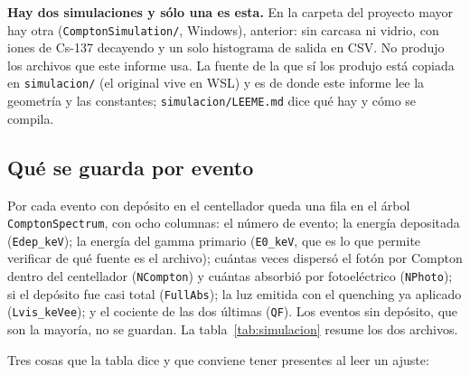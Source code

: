 \documentclass[11pt,a4paper]{article}
\begin{document}
\begin{aviso}
\textbf{Hay dos simulaciones y sólo una es esta.} En la carpeta del proyecto
mayor hay otra (\texttt{ComptonSimulation/}, Windows), anterior: sin carcasa
ni vidrio, con iones de Cs-137 decayendo y un solo histograma de salida en
CSV. No produjo los archivos que este informe usa. La fuente de la que sí los
produjo está copiada en \texttt{simulacion/} (el original vive en WSL) y es
de donde este informe lee la geometría y las constantes; \texttt{simulacion/LEEME.md}
dice qué hay y cómo se compila.
\end{aviso}

\subsection{Qué se guarda por evento}

Por cada evento con depósito en el centellador queda una fila en el árbol
\texttt{ComptonSpectrum}, con ocho columnas: el número de evento; la energía
depositada (\texttt{Edep\_keV}); la energía del gamma primario
(\texttt{E0\_keV}, que es lo que permite verificar de qué fuente es el
archivo); cuántas veces dispersó el fotón por Compton dentro del centellador
(\texttt{NCompton}) y cuántas absorbió por fotoeléctrico (\texttt{NPhoto});
si el depósito fue casi total (\texttt{FullAbs}); la luz emitida con el
quenching ya aplicado (\texttt{Lvis\_keVee}); y el cociente de las dos
últimas (\texttt{QF}). Los eventos sin depósito, que son la mayoría, no se
guardan. La tabla~\ref{tab:simulacion} resume los dos archivos.

\begin{table}[htbp]
\centering
\caption{Los dos archivos de simulación de la campaña, leídos de los propios
\texttt{.root}. El número de primarios lo escribe el programa en el nombre
del archivo a partir del \texttt{beamOn}. La fracción que deposita se compara
con la de la sección~\ref{sec:interaccion} (\ProbInteraccionCs\,\% y
\ProbInteraccionCoB\,\% por la sección eficaz total en \LadoDetector{} cm de
plástico): no tienen por qué coincidir exactamente, porque la tapa de Al
atenúa el haz y a la vez la carcasa entera dispersa fotones hacia adentro.}
\label{tab:simulacion}
{\small}
\end{table}

Tres cosas que la tabla dice y que conviene tener presentes al leer un
ajuste:
\end{document}

